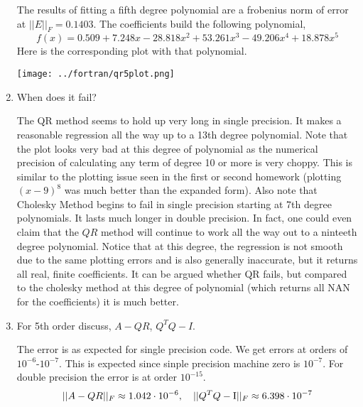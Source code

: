 \documentclass{article}
\begin{document}
\begin{enumerate}
The results of fitting a fifth degree polynomial are a frobenius norm of error at $||E||_F = 0.1403$. The coefficients build the following polynomial, 
    \[
        f(x) = 0.509 + 7.248x - 28.818x^2 + 53.261x^3 - 49.206x^4 + 18.878x^5
    \]
    Here is the corresponding plot with that polynomial. 
    
        \centering
        \texttt{[image: ../fortran/qr5plot.png]}
    \emp

\item When does it fail?
    
The QR method seems to hold up very long in single precision. It makes a reasonable regression all the way up to a 13th degree polynomial. Note that the plot looks very bad at this degree of polynomial as the numerical precision of calculating any term of degree 10 or more is very choppy. This is similar to the plotting issue seen in the first or second homework (plotting $(x-9)^8$ was much better than the expanded form). Also note that Cholesky Method begins to fail in single precision starting at 7th degree polynomials. It lasts much longer in double precision. In fact, one could even claim that the $QR$ method will continue to work all the way out to a ninteeth degree polynomial. Notice that at this degree, the regression is not smooth due to the same plotting errors and is also generally inaccurate, but it returns all real, finite coefficients. It can be argued whether QR fails, but compared to the cholesky method at this degree of polynomial (which returns all NAN for the coefficients) it is much better.

\item For 5th order discuss, $A - QR$, $Q^TQ - I$. 
    
The error is as expected for single precision code. We get errors at orders of $10^{-6}$-$10^{-7}$. This is expected since sinple precision machine zero is $10^{-7}$. For double precision the error is at order $10^{-15}$. 
    \[
        ||A-QR||_F \approx 1.042\cdot10^{-6}, \quad ||Q^TQ - \mathrm{I}||_F \approx 6.398\cdot10^{-7}
    \]

\end{enumerate}
\end{document}
